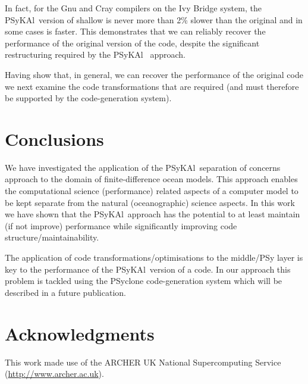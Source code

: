 \documentclass{IOS-Book-Article}
\newcommand{\psykal}{{PS}y{KA}l\ }
\begin{document}
In fact, for the Gnu and Cray compilers on the Ivy Bridge system, the
\psykal version of shallow is never more than 2\% slower than the
original and in some cases is faster.  This demonstrates that we can
reliably recover the performance of the original version of the code,
despite the significant restructuring required by the \psykal
approach.

Having show that, in general, we can recover the performance of the
original code we next examine the code transformations that are required
(and must therefore be supported by the code-generation system).

\section{Conclusions}

We have investigated the application of the \psykal separation of
concerns approach to the domain of finite-difference ocean
models. This approach enables the computational science (performance)
related aspects of a computer model to be kept separate from the
natural (oceanographic) science aspects. In this work we have shown
that the \psykal approach has the potential to at least maintain (if
not improve) performance while significantly improving code
structure/maintainability.

The application of code transformations/optimisations to the
middle/PSy layer is key to the performance of the \psykal version of a
code. In our approach this problem is tackled using the PSyclone
code-generation system which will be described in a future
publication.

\section{Acknowledgments}

This work made use of the ARCHER UK National Supercomputing Service
(\url{http://www.archer.ac.uk}).

{}

\end{document}
